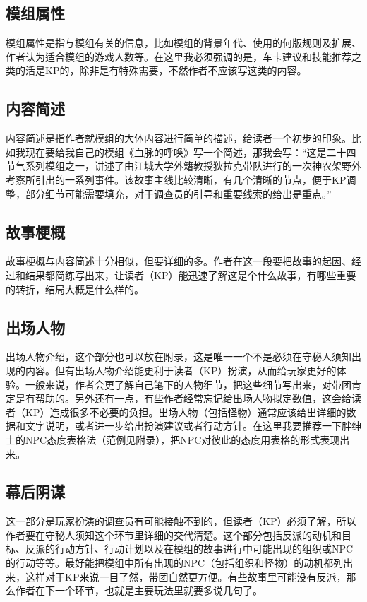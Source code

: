 \documentclass[a4paper,zihao=-4,notitlepage,twoside,openright]{ctexart}
\begin{document}
\subsection{模组属性}

模组属性是指与模组有关的信息，比如模组的背景年代、使用的何版规则及扩展、作者认为适合模组的游戏人数等。在这里我必须强调的是，车卡建议和技能推荐之类的活是KP的，除非是有特殊需要，不然作者不应该写这类的内容。

\subsection{内容简述}

内容简述是指作者就模组的大体内容进行简单的描述，给读者一个初步的印象。比如我现在要给我自己的模组《血脉的呼唤》写一个简述，那我会写：“这是二十四节气系列模组之一，讲述了由江城大学外籍教授狄拉克带队进行的一次神农架野外考察所引出的一系列事件。该故事主线比较清晰，有几个清晰的节点，便于KP调整，部分细节可能需要填充，对于调查员的引导和重要线索的给出是重点。”

\subsection{故事梗概}

故事梗概与内容简述十分相似，但要详细的多。作者在这一段要把故事的起因、经过和结果都简练写出来，让读者（KP）能迅速了解这是个什么故事，有哪些重要的转折，结局大概是什么样的。

\subsection{出场人物}

出场人物介绍，这个部分也可以放在附录，这是唯一一个不是必须在守秘人须知出现的内容。但有出场人物介绍能更利于读者（KP）扮演，从而给玩家更好的体验。一般来说，作者会更了解自己笔下的人物细节，把这些细节写出来，对带团肯定是有帮助的。另外还有一点，有些作者经常忘记给出场人物拟定数值，这会给读者（KP）造成很多不必要的负担。出场人物（包括怪物）通常应该给出详细的数据和文字说明，或者进一步给出扮演建议或者行动方针。在这里我要推荐一下胖绅士的NPC态度表格法（范例见附录），把NPC对彼此的态度用表格的形式表现出来。

\subsection{幕后阴谋}

这一部分是玩家扮演的调查员有可能接触不到的，但读者（KP）必须了解，所以作者要在守秘人须知这个环节里详细的交代清楚。这个部分包括反派的动机和目标、反派的行动方针、行动计划以及在模组的故事进行中可能出现的组织或NPC的行动等等。最好能把模组中所有出现的NPC（包括组织和怪物）的动机都列出来，这样对于KP来说一目了然，带团自然更方便。有些故事里可能没有反派，那么作者在下一个环节，也就是主要玩法里就要多说几句了。
\end{document}
